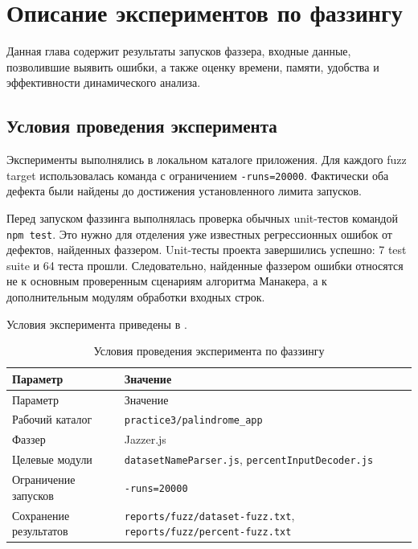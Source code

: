 \chapter{Описание экспериментов по фаззингу} \label{ch2}

Данная глава содержит результаты запусков фаззера, входные данные, позволившие
выявить ошибки, а также оценку времени, памяти, удобства и эффективности
динамического анализа.

\section{Условия проведения эксперимента} \label{ch2:sec1}

Эксперименты выполнялись в локальном каталоге приложения. Для каждого fuzz target
использовалась команда с ограничением \texttt{-runs=20000}. Фактически оба дефекта
были найдены до достижения установленного лимита запусков.

Перед запуском фаззинга выполнялась проверка обычных unit-тестов командой
\texttt{npm test}. Это нужно для отделения уже известных регрессионных ошибок от
дефектов, найденных фаззером. Unit-тесты проекта завершились успешно: 7 test suite
и 64 теста прошли. Следовательно, найденные фаззером ошибки относятся не к
основным проверенным сценариям алгоритма Манакера, а к дополнительным модулям
обработки входных строк.

Условия эксперимента приведены в .

\noindent
\begingroup
\centering
\small
\begin{longtable}[c]{|p{5cm}|p{10cm}|}
    \caption{Условия проведения эксперимента по фаззингу}
    \label{tab:fuzz-exp-env}
    \\
    \hline
    Параметр & Значение \\ \hline
    \endfirsthead
    \hline
    Параметр & Значение \\ \hline
    \endhead
    \hline
    Рабочий каталог & \texttt{practice3/palindrome\_app} \\ \hline
    Фаззер & Jazzer.js \\ \hline
    Целевые модули & \texttt{datasetNameParser.js}, \texttt{percentInputDecoder.js} \\ \hline
    Ограничение запусков & \texttt{-runs=20000} \\ \hline
    Сохранение результатов & \texttt{reports/fuzz/dataset-fuzz.txt}, \texttt{reports/fuzz/percent-fuzz.txt} \\ \hline
\end{longtable}
\normalsize
\endgroup

